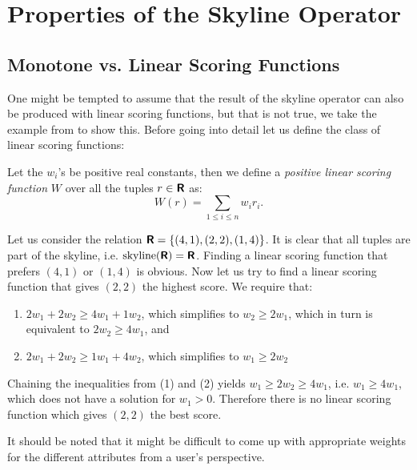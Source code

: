 

\section{Properties of the Skyline Operator}
\subsection{Monotone vs. Linear Scoring Functions}
\label{sec:scoring}
One might be tempted to assume that the result of the skyline operator
can also be produced with linear scoring functions, but that is not
true, we take the example from \citep{Chomicki2002a} to show this.  
Before going into detail let us define the class of linear
scoring functions:

\begin{definition}
Let the $w_i$'s be positive real constants, then we define a 
\emph{positive linear scoring function} $W$ over all the tuples 
$r \in \textnormal{\bf\textsf{R}}$ as:
\[
W(r) = \sum_{1 \le i \le n} w_i r_i.
\]
\end{definition}

Let us consider the relation $\textnormal{\bf\textsf{R}} = \{ (4,1), (2,2), (1,4)
\}$.  It is clear that all tuples are part of the skyline,
i.e. $\skyline(\relation R) = \relation R$.  Finding a linear scoring
function that prefers $(4, 1)$ or $(1,4)$ is obvious.  Now let us try
to find a linear scoring function that gives $(2, 2)$ the highest
score.  We require that:
\begin{enumerate}
\item 
$2 w_1 + 2 w_2 \ge 4 w_1 + 1 w_2$, which simplifies to $w_2 \ge 2 w_1$, which in turn
is equivalent to $2 w_2 \ge 4 w_1$, and
\item $2 w_1 + 2 w_2 \ge 1 w_1 + 4 w_2$, which simplifies to $w_1 \ge 2 w_2$
\end{enumerate}
Chaining the inequalities from (1) and (2) yields $w_1 \ge 2 w_2 \ge 4
w_1$, i.e. $w_1 \ge 4 w_1$, which does not have a solution for $w_1 >
0$.  Therefore there is no linear scoring function which gives
$(2,2)$ the best score.

It should be noted that it might be difficult to come up with
appropriate weights for the different attributes from a user's
perspective.

